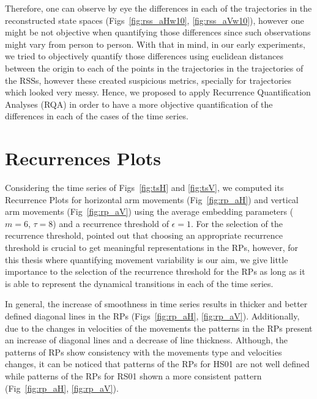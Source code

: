 Therefore, one can observe by eye the differences in each of the trajectories 
in the reconstructed state spaces 
(Figs~\ref{fig:rss_aHw10}, \ref{fig:rss_aVw10}), 
however one might be not objective when quantifying those differences 
since such observations might vary from person to person.
With that in mind, in our early experiments, we tried to objectively 
quantify those differences using euclidean distances between 
the origin to each of the points in the trajectories in the trajectories of 
the RSSs, however these created suspicious metrics, specially 
for trajectories which looked very messy.
Hence, we proposed to apply Recurrence Quantification Analyses (RQA) 
in order to have a more objective quantification of the differences 
in each of the cases of the time series.


\newpage
\section{Recurrences Plots}
Considering the time series of Figs~\ref{fig:tsH} and \ref{fig:tsV}, 
we computed its Recurrence Plots for horizontal arm movements 
(Fig~\ref{fig:rp_aH}) and vertical arm movements (Fig~\ref{fig:rp_aV}) 
using the average embedding parameters ($m=6$, $\tau=8$) and a recurrence 
threshold of $\epsilon=1$. For the selection of the recurrence threshold,
\cite{marwan2011} pointed out that choosing an appropriate 
recurrence threshold is crucial to get meaningful representations in the RPs, 
however, for this thesis where quantifying movement variability is our aim,
we give little importance to the selection of the recurrence threshold 
for the RPs as long as it is able to represent the dynamical transitions 
in each of the time series.

In general, the increase of smoothness in time series results in thicker 
and better defined diagonal lines in the RPs 
(Figs~\ref{fig:rp_aH}, \ref{fig:rp_aV}).
Additionally, due to the changes in velocities of the movements 
the patterns in the RPs present an increase of diagonal lines 
and a decrease of line thickness.
Although, the patterns of RPs show consistency with the movements type 
and velocities changes, it can be noticed that patterns of the RPs for 
HS01 are not well defined while patterns of the RPs for RS01 
shown a more consistent pattern (Fig~\ref{fig:rp_aH}, \ref{fig:rp_aV}). 

